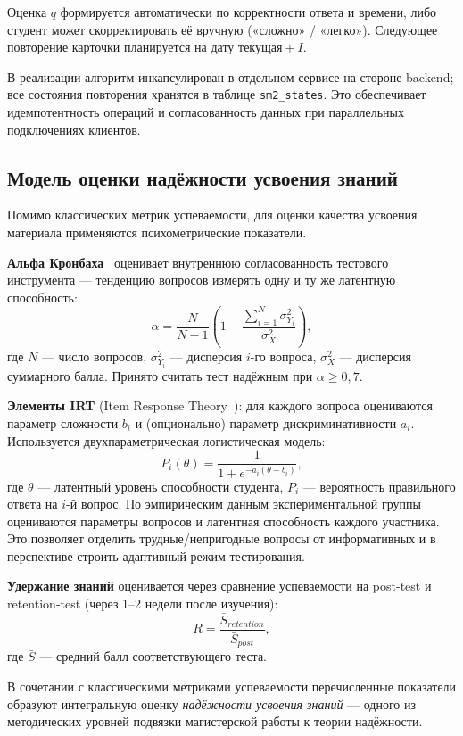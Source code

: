 Оценка $q$ формируется автоматически по корректности ответа
и времени, либо студент может скорректировать её вручную
(«сложно» / «легко»). Следующее повторение карточки планируется
на дату $\text{текущая} + I$.

В реализации алгоритм инкапсулирован в отдельном сервисе на стороне
backend; все состояния повторения хранятся в таблице
\texttt{sm2\_states}. Это обеспечивает идемпотентность операций
и согласованность данных при параллельных подключениях клиентов.

\subsection{Модель оценки надёжности усвоения знаний}

Помимо классических метрик успеваемости, для оценки качества
усвоения материала применяются психометрические показатели.

\textbf{Альфа Кронбаха}~\cite{cronbach1951} оценивает внутреннюю
согласованность тестового инструмента --- тенденцию вопросов
измерять одну и ту же латентную способность:
\[
    \alpha = \frac{N}{N-1} \left(1 - \frac{\sum_{i=1}^N \sigma_{Y_i}^2}{\sigma_X^2}\right),
\]
где $N$ --- число вопросов, $\sigma_{Y_i}^2$ --- дисперсия
$i$-го вопроса, $\sigma_X^2$ --- дисперсия суммарного балла.
Принято считать тест надёжным при $\alpha \geq 0{,}7$.

\textbf{Элементы IRT} (Item Response Theory~\cite{crocker_algina}):
для каждого вопроса оцениваются параметр сложности $b_i$
и (опционально) параметр дискриминативности $a_i$. Используется
двухпараметрическая логистическая модель:
\[
    P_i(\theta) = \frac{1}{1 + e^{-a_i(\theta - b_i)}},
\]
где $\theta$ --- латентный уровень способности студента,
$P_i$ --- вероятность правильного ответа на $i$-й вопрос.
По эмпирическим данным экспериментальной группы оцениваются
параметры вопросов и латентная способность каждого участника.
Это позволяет отделить трудные/непригодные вопросы от информативных
и в перспективе строить адаптивный режим тестирования.

\textbf{Удержание знаний} оценивается через сравнение успеваемости
на post-test и retention-test (через 1--2 недели после изучения):
\[
    R = \frac{\bar{S}_{retention}}{\bar{S}_{post}},
\]
где $\bar{S}$ --- средний балл соответствующего теста.

В сочетании с классическими метриками успеваемости перечисленные
показатели образуют интегральную оценку \textit{надёжности усвоения
знаний} --- одного из методических уровней подвязки магистерской
работы к теории надёжности.

